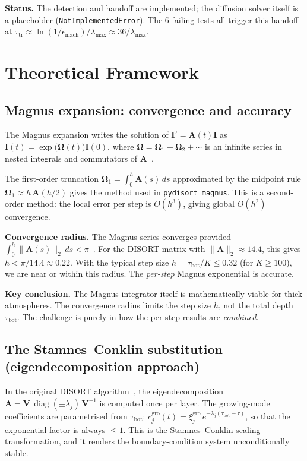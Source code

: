 \documentclass[11pt,a4paper]{article}
\newcommand{\diag}{\operatorname{diag}}
\newcommand{\vect}[1]{\bm{#1}}
\newcommand{\mat}[1]{\mathbf{#1}}
\newcommand{\tbot}{\tau_{\mathrm{bot}}}
\newcommand{\ttrans}{\tau_{\mathrm{tr}}}
\theoremstyle{definition}
\begin{document}
\textbf{Status.}  The detection and handoff are implemented; the diffusion
solver itself is a placeholder (\texttt{NotImplementedError}).  The 6 failing
tests all trigger this handoff at
$\ttrans\approx\ln(1/\epsilon_{\text{mach}})/\lambda_{\max}\approx
36/\lambda_{\max}$.


\section{Theoretical Framework}\label{sec:theory}

\subsection{Magnus expansion: convergence and accuracy}
The Magnus expansion writes the solution of $\vect{I}'=\mat{A}(t)\vect{I}$
as $\vect{I}(t)=\exp\bigl(\mat{\Omega}(t)\bigr)\vect{I}(0)$, where
$\mat{\Omega}=\mat{\Omega}_1+\mat{\Omega}_2+\cdots$ is an infinite series
in nested integrals and commutators of $\mat{A}$~\cite{magnus1954,blanes2009}.

The first-order truncation $\mat{\Omega}_1=\int_0^h \mat{A}(s)\,ds$
approximated by the midpoint rule $\mat{\Omega}_1\approx h\,\mat{A}(h/2)$
gives the method used in \texttt{pydisort\_magnus}.  This is a
second-order method: the local error per step is $O(h^3)$, giving global
$O(h^2)$ convergence.

\textbf{Convergence radius.}  The Magnus series converges provided
$\int_0^h\|\mat{A}(s)\|_2\,ds < \pi$~\cite{blanes2009,moan2008}.  For the
DISORT matrix with $\|\mat{A}\|_2\approx 14.4$, this gives
$h<\pi/14.4\approx 0.22$.  With the typical step size
$h=\tbot/K \leq 0.32$ (for $K\geq 100$), we are near or within this radius.
The \emph{per-step} Magnus exponential is accurate.

\textbf{Key conclusion.}  The Magnus integrator itself is mathematically
viable for thick atmospheres.  The convergence radius limits the step size
$h$, not the total depth $\tbot$.  The challenge is purely in how the
per-step results are \emph{combined}.

\subsection{The Stamnes--Conklin substitution (eigendecomposition approach)}
In the original DISORT algorithm~\cite{stamnes1988}, the eigendecomposition
$\mat{A}=\mat{V}\,\diag(\pm\lambda_j)\,\mat{V}^{-1}$ is computed once per
layer.  The growing-mode coefficients are parametrised from $\tbot$:
$c_j^{\text{gro}}(t)=\xi_j^{\text{gro}}\,e^{-\lambda_j(\tbot-\tau)}$,
so that the exponential factor is always $\leq 1$.  This is the
Stamnes--Conklin scaling transformation, and it renders the boundary-condition
system unconditionally stable.
\end{document}
